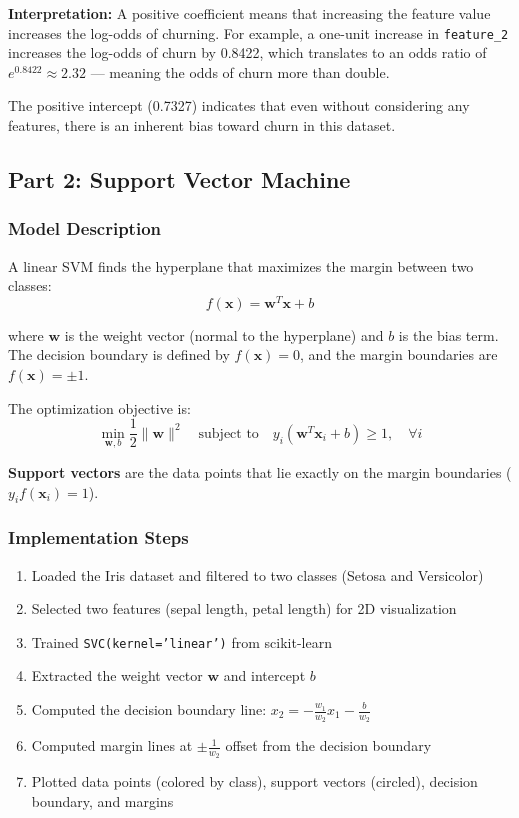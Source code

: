 \documentclass[12pt,a4paper]{article}
\begin{document}
\textbf{Interpretation:} A positive coefficient means that increasing the feature value increases the log-odds of churning. For example, a one-unit increase in \texttt{feature\_2} increases the log-odds of churn by 0.8422, which translates to an odds ratio of $e^{0.8422} \approx 2.32$ --- meaning the odds of churn more than double.

The positive intercept (0.7327) indicates that even without considering any features, there is an inherent bias toward churn in this dataset.

\subsection{Part 2: Support Vector Machine}

\subsubsection{Model Description}
A linear SVM finds the hyperplane that maximizes the margin between two classes:
\begin{equation}
    f(\mathbf{x}) = \mathbf{w}^T \mathbf{x} + b
\end{equation}

where $\mathbf{w}$ is the weight vector (normal to the hyperplane) and $b$ is the bias term. The decision boundary is defined by $f(\mathbf{x}) = 0$, and the margin boundaries are $f(\mathbf{x}) = \pm 1$.

The optimization objective is:
\begin{equation}
    \min_{\mathbf{w}, b} \frac{1}{2}\|\mathbf{w}\|^2 \quad \text{subject to} \quad y_i(\mathbf{w}^T \mathbf{x}_i + b) \geq 1, \quad \forall i
\end{equation}

\textbf{Support vectors} are the data points that lie exactly on the margin boundaries ($y_i f(\mathbf{x}_i) = 1$).

\subsubsection{Implementation Steps}
\begin{enumerate}
    \item Loaded the Iris dataset and filtered to two classes (Setosa and Versicolor)
    \item Selected two features (sepal length, petal length) for 2D visualization
    \item Trained \texttt{SVC(kernel='linear')} from scikit-learn
    \item Extracted the weight vector $\mathbf{w}$ and intercept $b$
    \item Computed the decision boundary line: $x_2 = -\frac{w_1}{w_2} x_1 - \frac{b}{w_2}$
    \item Computed margin lines at $\pm \frac{1}{w_2}$ offset from the decision boundary
    \item Plotted data points (colored by class), support vectors (circled), decision boundary, and margins
\end{enumerate}
\end{document}
